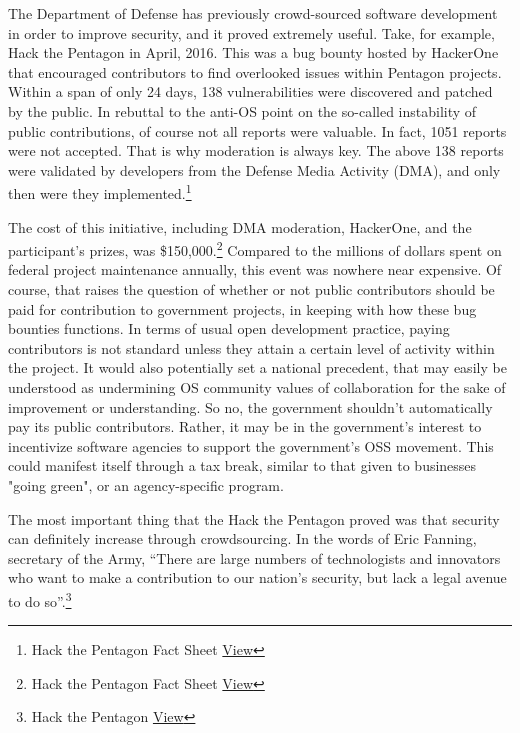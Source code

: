 \documentclass[a4paper]{article}
\begin{document}
The Department of Defense has previously crowd-sourced software development in order to improve security, and it proved extremely useful. Take, for example, Hack the Pentagon in April, 2016. This was a bug bounty hosted by HackerOne that encouraged contributors to find overlooked issues within Pentagon projects. Within a span of only 24 days, 138 vulnerabilities were discovered and patched by the public. In rebuttal to the anti-OS point on the so-called instability of public contributions, of course not all reports were valuable. In fact, 1051 reports were not accepted. That is why moderation is always key. The above 138 reports were validated by developers from the Defense Media Activity (DMA), and only then were they implemented.\footnote{Hack the Pentagon Fact Sheet \href{https://www.defense.gov/Portals/1/Documents/Fact_Sheet_Hack_the_Pentagon.pdf}{View}}

	The cost of this initiative, including DMA moderation, HackerOne, and the participant's prizes, was \$150,000.\footnote{Hack the Pentagon Fact Sheet \href{https://www.defense.gov/Portals/1/Documents/Fact_Sheet_Hack_the_Pentagon.pdf}{View}} Compared to the millions of dollars spent on federal project maintenance annually, this event was nowhere near expensive. Of course, that raises the question of whether or not public contributors should be paid for contribution to government projects, in keeping with how these bug bounties functions. In terms of usual open development practice, paying contributors is not standard unless they attain a certain level of activity within the project. It would also potentially set a national precedent, that may easily be understood as undermining OS community values of collaboration for the sake of improvement or understanding. So no, the government shouldn't automatically pay its public contributors. Rather, it may be in the government's interest to incentivize software agencies to support the government's OSS movement. This could manifest itself through a tax break, similar to that given to businesses "going green", or an agency-specific program.

	The most important thing that the Hack the Pentagon proved was that security can definitely increase through crowdsourcing. In the words of Eric Fanning, secretary of the Army, “There are large numbers of technologists and innovators who want to make a contribution to our nation’s security, but lack a legal avenue to do so”.\footnote{Hack the Pentagon \href{https://www.hackerone.com/resources/hack-the-pentagon}{View}}
\end{document}
